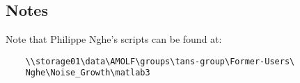 \subsection*{Notes}

Note that Philippe Nghe's scripts can be found at:

\begin{verbatim}
    \\storage01\data\AMOLF\groups\tans-group\Former-Users\
    Nghe\Noise_Growth\matlab3
\end{verbatim}


%


